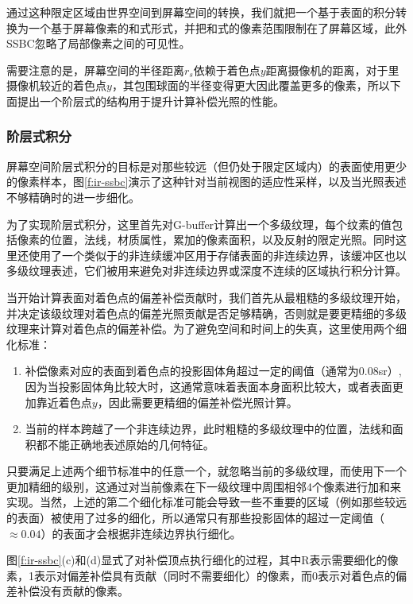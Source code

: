 通过这种限定区域由世界空间到屏幕空间的转换，我们就把一个基于表面的积分转换为一个基于屏幕像素的和式形式，并把和式的像素范围限制在了屏幕区域，此外SSBC忽略了局部像素之间的可见性。

需要注意的是，屏幕空间的半径距离$r_s$依赖于着色点$y$距离摄像机的距离，对于里摄像机较近的着色点$y$，其包围球面的半径变得更大因此覆盖更多的像素，所以下面提出一个阶层式的结构用于提升计算补偿光照的性能。 



\subsubsection{阶层式积分}
屏幕空间阶层式积分的目标是对那些较远（但仍处于限定区域内）的表面使用更少的像素样本，图\ref{f:ir-ssbc}演示了这种针对当前视图的适应性采样，以及当光照表述不够精确时的进一步细化。

为了实现阶层式积分，这里首先对G-buffer计算出一个多级纹理，每个纹素的值包括像素的位置，法线，材质属性，累加的像素面积，以及反射的限定光照。同时这里还使用了一个类似于\cite{a:Hierarchicalimage-spaceradiosityforinteractiveglobalillumination}的非连续缓冲区用于存储表面的非连续边界，该缓冲区也以多级纹理表述，它们被用来避免对非连续边界或深度不连续的区域执行积分计算。

当开始计算表面对着色点的偏差补偿贡献时，我们首先从最粗糙的多级纹理开始，并决定该级纹理对着色点的偏差光照贡献是否足够精确，否则就是要更精细的多级纹理来计算对着色点的偏差补偿。为了避免空间和时间上的失真，这里使用两个细化标准：

\begin{enumerate}
	\item 补偿像素对应的表面到着色点的投影固体角超过一定的阈值（通常为0.08sr）,因为当投影固体角比较大时，这通常意味着表面本身面积比较大，或者表面更加靠近着色点$y$，因此需要更精细的偏差补偿光照计算。
	\item 当前的样本跨越了一个非连续边界，此时粗糙的多级纹理中的位置，法线和面积都不能正确地表述原始的几何特征。
\end{enumerate}

只要满足上述两个细节标准中的任意一个，就忽略当前的多级纹理，而使用下一个更加精细的级别，这通过对当前像素在下一级纹理中周围相邻4个像素进行加和来实现。当然，上述的第二个细化标准可能会导致一些不重要的区域（例如那些较远的表面）被使用了过多的细化，所以通常只有那些投影固体的超过一定阈值（$\approx 0.04$）的表面才会根据非连续边界执行细化。

图\ref{f:ir-ssbc}(c)和(d)显式了对补偿顶点执行细化的过程，其中R表示需要细化的像素，1表示对偏差补偿具有贡献（同时不需要细化）的像素，而0表示对着色点的偏差补偿没有贡献的像素。
 
